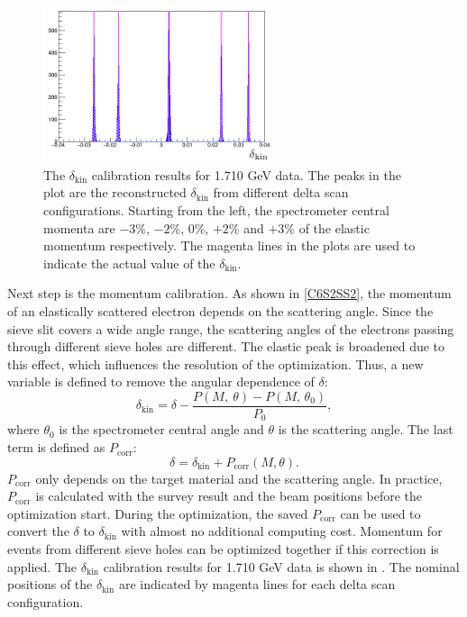 \begin{figure}[tb!]
  \centering
  \includegraphics[width=0.6\textwidth]{figs/delta-pattern.png}
  \caption[The $\delta_{\mathrm{kin}}$ calibration results for 1.710 GeV data.]{The $\delta_{\mathrm{kin}}$ calibration results for 1.710 GeV data. The peaks in the plot are the reconstructed $\delta_{\mathrm{kin}}$ from different delta scan configurations. Starting from the left, the spectrometer central momenta are $-3\%$, $-2\%$, $0\%$, $+2\%$ and $+3\%$ of the elastic momentum respectively. The magenta lines in the plots are used to indicate the actual value of the $\delta_{\mathrm{kin}}$. \label{C6S3F4}}
\end{figure}

Next step is the momentum calibration. As shown in \cref{C6S2SS2}, the momentum of an elastically scattered electron depends on the scattering angle. Since the sieve slit covers a wide angle range, the scattering angles of the electrons passing through different sieve holes are different. The elastic peak is broadened due to this effect, which influences the resolution of the optimization. Thus, a new variable is defined to remove the angular dependence of $\delta$:
\begin{equation} \label{C6S3E4}
\delta_{\mathrm{kin}} = \delta - \frac{P(M,\ \theta)-P(M,\, \theta_0)}{P_0},
\end{equation}
where $\theta_0$ is the spectrometer central angle and $\theta$ is the scattering angle. The last term is defined as $P_{\mathrm{corr}}$:
\begin{equation} \label{C6S3E5}
\delta = \delta_{\mathrm{kin}} + P_{\mathrm{corr}}(M, \theta).
\end{equation}
$P_{\mathrm{corr}}$ only depends on the target material and the scattering angle. In practice, $P_{\mathrm{corr}}$ is calculated with the survey result and the beam positions before the optimization start. During the optimization, the saved $P_{\mathrm{corr}}$ can be used to convert the $\delta$ to $\delta_{\mathrm{kin}}$ with almost no additional computing cost. Momentum for events from different sieve holes can be optimized together if this correction is applied. The $\delta_{\mathrm{kin}}$ calibration results for 1.710 GeV data is shown in . The nominal positions of the $\delta_{\mathrm{kin}}$ are indicated by magenta lines for each delta scan configuration.

